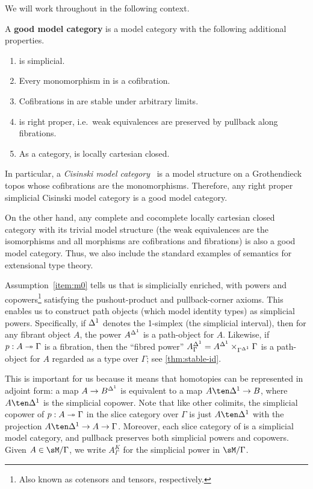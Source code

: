 \documentclass{amsart}
\begin{document}
We will work throughout in the following context.

\begin{defn}
  A \textbf{good model category} is a model category \sM with the following additional properties.
  \begin{enumerate}
  \item \sM is simplicial.\label{item:m0}
  \item Every monomorphism in \sM is a cofibration.\label{item:m1}
  \item Cofibrations in \sM are stable under arbitrary limits.\label{item:m1a}
  \item \sM is right proper, i.e.\ weak equivalences are preserved by pullback along fibrations.\label{item:m2}
  \item As a category, \sM is locally cartesian closed.\label{item:m3}
  \end{enumerate}
\end{defn}

In particular, a \emph{Cisinski model category}~\cite{cisinski:topos,cisinski:presheaves} is a model structure on a Grothendieck topos whose cofibrations are the monomorphisms.
Therefore, any right proper simplicial Cisinski model category is a good model category.

On the other hand, any complete and cocomplete locally cartesian closed category with its trivial model structure (the weak equivalences are the isomorphisms and all morphisms are cofibrations and fibrations) is also a good model category.
Thus, we also include the standard examples of semantics for extensional type theory.

Assumption~\ref{item:m0} tells us that \sM is simplicially enriched, with powers and copowers\footnote{Also known as cotensors and tensors, respectively.} satisfying the pushout-product and pullback-corner axioms.
This enables us to construct path objects (which model identity types) as simplicial powers.
Specifically, if ${\Delta^1}$ denotes the 1-simplex (the simplicial interval), then for any fibrant object $A$, the power $A^{\Delta^1}$ is a path-object for $A$.
Likewise, if $p:A\twoheadrightarrow \Gamma$ is a fibration, then the ``fibred power'' $A^{\Delta^1}_\Gamma = A^{\Delta^1} \times_{\Gamma^{\Delta^1}} \Gamma$ is a path-object for $A$ regarded as a type over $\Gamma$; see \cref{thm:stable-id}.

This is important for us because it means that homotopies can be represented in adjoint form: a map $A\to B^{\Delta^1}$ is equivalent to a map $A\ten \ivl \to B$, where $A\ten \ivl$ is the simplicial copower.
Note that like other colimits, the simplicial copower of $p:A\twoheadrightarrow \Gamma$ in the slice category over $\Gamma$ is just $A\ten\ivl$ with the projection $A\ten\ivl \to A \to \Gamma$.
Moreover, each slice category of \sM is a simplicial model category, and pullback preserves both simplicial powers and copowers.
Given $A\in\sM/\Gamma$, we write $A^K_\Gamma$ for the simplicial power in $\sM/\Gamma$.
\end{document}
